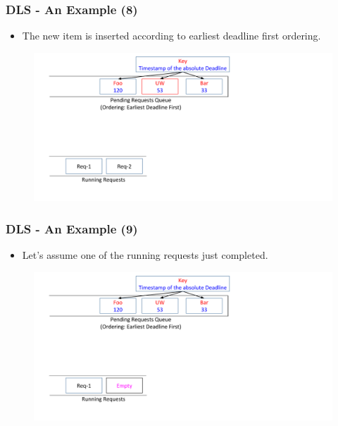 \documentclass{beamer}
\begin{document}
\begin{frame}
  \frametitle{DLS - An Example (8)}
  \begin{itemize}
  \item The new item is inserted according to earliest deadline first ordering.
    \newline
  \end{itemize}
  \begin{figure}
    \begin{center}
      \centerline{\includegraphics[scale=0.33]{img/DLS_Example8_2.png}}
    \end{center}
  \end{figure}
\end{frame}


\begin{frame}
  \frametitle{DLS - An Example (9)}
  \begin{itemize}
  \item Let's assume one of the running requests just completed.
    \newline
    \newline
  \end{itemize}
  \begin{figure}
    \begin{center}
      \centerline{\includegraphics[scale=0.33]{img/DLS_Example8_3.png}}
    \end{center}
  \end{figure}
\end{frame}
\end{document}
